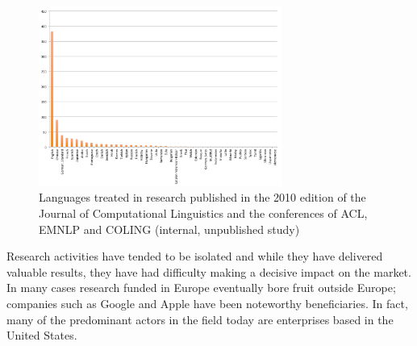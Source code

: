\documentclass[10pt, plain]{../../metanetpaper}
\begin{document}
\begin{multicols}{2}
\begin{figure}[htb]
  \center
  \includegraphics[width=0.71\textwidth]{../_media/Languages-in-LT-Research}
  \caption{Languages treated in research published in the 2010 edition of the Journal of Computational Linguistics and the conferences of ACL, EMNLP and COLING (internal, unpublished study)}
  \label{fig:languages-in-research}
\end{figure}

Research activities have tended to be isolated and while they have delivered valuable results, they have had difficulty making a decisive impact on the market. In many cases research funded in Europe eventually bore fruit outside Europe; companies such as Google and Apple have been noteworthy beneficiaries. In fact, many of the predominant actors in the field today are enterprises based in the United States.

%
%
%
%


\end{multicols}
\end{document}
